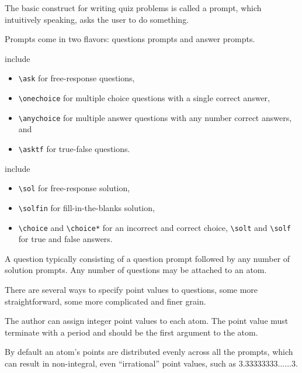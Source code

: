 \begin{cluster}
\label{grp:grm:quiz::construct}

\begin{gram}
\label{grm:quiz::construct}
The basic construct for writing quiz problems is called a  prompt, which intuitively speaking, asks the user to do something.

\end{gram}
\end{cluster}

\begin{cluster}
\label{grp:grm:quiz::prompts}

\begin{gram}[Prompts]
\label{grm:quiz::prompts}
Prompts come in two flavors: questions prompts and answer prompts.

  include 
\begin{itemize}
\item \lstinline`\ask` for free-response questions, 
\item \lstinline`\onechoice` for multiple choice questions with a single correct answer, 
\item \lstinline`\anychoice` for multiple answer questions with any number correct answers, and 
\item \lstinline`\asktf` for true-false questions.
\end{itemize}

  include 
\begin{itemize}

\item \lstinline`\sol` for free-response solution, 
\item \lstinline`\solfin` for fill-in-the-blanks solution, 
\item \lstinline`\choice` and \lstinline`\choice*` for an incorrect and correct choice, 
\lstinline`\solt` and \lstinline`\solf`   for true and false answers.
\end{itemize}

A question typically consisting of a question prompt followed by any
number of solution prompts.  
Any number of questions may be attached  to an atom.

\end{gram}
\end{cluster}

\begin{cluster}
\label{grp:grm:quiz::point-values}

\begin{gram}
\label{grm:quiz::point-values}
There are several ways to specify point values to questions, some more
straightforward, some more complicated and finer grain.

The author can assign integer point values to each atom. 
The point value must terminate with a period and should be the first argument to the atom.

By default an atom's points are distributed evenly across all the
prompts, which can result in non-integral, even ``irrational'' point
values, such as $3.33333333...\ldots 3$.  

\end{gram}
\end{cluster}

